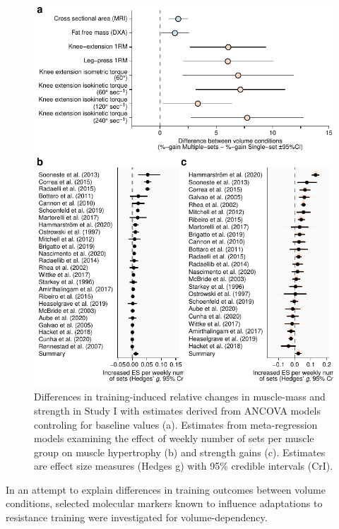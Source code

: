 \documentclass[twoside,10pt]{gihclass} %
\begin{document}
\begin{figure}

{\centering \includegraphics{thesis_files/figure-latex/comb-fig-s1-1} 

}

\caption[Differences in training induced changes to muscle mass and strength measures between volume conditions in Study I and weekly training volume meta-regression.]{Differences in training-induced relative changes in muscle-mass and strength in Study I with estimates derived from ANCOVA models controling for baseline values (a). Estimates from meta-regression models examining the effect of weekly number of sets per muscle group on muscle hypertrophy (b) and strength gains (c). Estimates are effect size measures (Hedges g) with 95\% credible intervals (CrI).}\label{fig:comb-fig-s1}
\end{figure}
In an attempt to explain differences in training outcomes between volume conditions, selected molecular markers known to influence adaptations to resistance training were investigated for volume-dependency.
\end{document}
